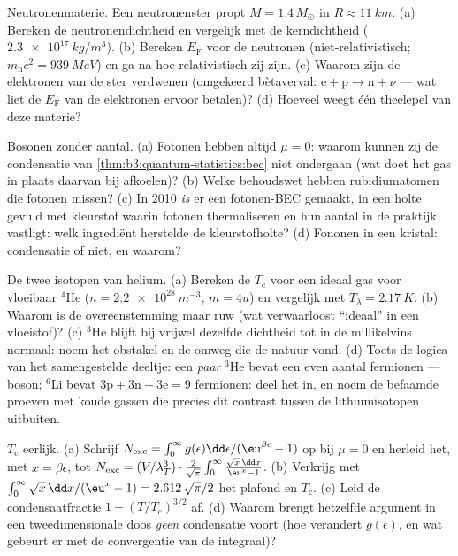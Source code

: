 \begin{exercise}[$\star\star$]\label{exo:b3:quantum-statistics:7}
Neutronenmaterie. Een neutronenster propt $M = 1.4\,M_\odot$ in $R
\approx \qty{11}{km}$. (a) Bereken de neutronendichtheid en vergelijk met de
kerndichtheid ($\qty{2.3e17}{kg/m^3}$). (b) Bereken $E_{\text{F}}$ voor de
neutronen (niet-relativistisch; $m_{\text{n}}c^2
= \qty{939}{MeV}$) en ga
na hoe relativistisch zij zijn. (c) Waarom zijn de elektronen van de ster
verdwenen (omgekeerd bètaverval: $\text{e} + \text{p} \to \text{n} + \nu$
--- wat liet de $E_{\text{F}}$ van de elektronen ervoor betalen)? (d)
Hoeveel weegt één theelepel van deze materie?
\end{exercise}

\begin{exercise}[$\star\star$]\label{exo:b3:quantum-statistics:8}
Bosonen zonder aantal. (a) Fotonen hebben altijd $\mu = 0$: waarom kunnen
zij de condensatie van \cref{thm:b3:quantum-statistics:bec} niet ondergaan
(wat doet het gas in plaats daarvan bij afkoelen)? (b) Welke behoudswet
hebben rubidiumatomen die fotonen missen? (c) In 2010 \emph{is} er een
fotonen-BEC gemaakt, in een holte gevuld met kleurstof waarin fotonen
thermaliseren en hun aantal in de praktijk vastligt: welk ingrediënt
herstelde de kleurstofholte? (d) Fononen in een kristal: condensatie of
niet, en waarom?
\end{exercise}

\begin{exercise}[$\star\star$]\label{exo:b3:quantum-statistics:9}
De twee isotopen van helium. (a) Bereken de $T_{\text{c}}$ voor een ideaal
gas voor vloeibaar $^4$He ($n = \qty{2.2e28}{m^{-3}}$, $m = 4u$) en
vergelijk met $T_\lambda = \qty{2.17}{K}$. (b) Waarom is de
overeenstemming maar ruw (wat verwaarloost ``ideaal'' in een vloeistof)?
(c) $^3$He blijft bij vrijwel dezelfde dichtheid tot in de millikelvins
normaal: noem het obstakel en de omweg die de natuur vond. (d) Toets de
logica van het samengestelde deeltje: een \emph{paar} $^3$He bevat een
even aantal fermionen --- boson; $^6$Li bevat $3\text{p} + 3\text{n}
+ 3\text{e} = 9$ fermionen: deel het in, en noem de befaamde proeven met
koude gassen die precies dit contrast tussen de lithiumisotopen uitbuiten.
\end{exercise}

\begin{exercise}[$\star\star\star$]\label{exo:b3:quantum-statistics:10}
$T_{\text{c}}$ eerlijk. (a) Schrijf $N_{\text{exc}} = \int_0^\infty
g(\epsilon)\dd\epsilon/(\eu^{\beta\epsilon} - 1)$ op bij $\mu = 0$ en
herleid het, met $x = \beta\epsilon$, tot $N_{\text{exc}} =
(V/\lambda_T^3)\cdot\frac{2}{\sqrt\pi}\int_0^\infty\frac{\sqrt
x\,\dd x}{\eu^x - 1}$. (b) Verkrijg met $\int_0^\infty\sqrt x\,\dd x/(
\eu^x - 1) = 2.612\,\sqrt\pi/2$ het plafond en $T_{\text{c}}$. (c) Leid de
condensaatfractie $1 -
(T/T_{\text{c}})^{3/2}$ af. (d) Waarom brengt
hetzelfde argument in een tweedimensionale doos \emph{geen} condensatie
voort (hoe verandert $g(
\epsilon)$, en wat gebeurt er met de convergentie
van de integraal)?
\end{exercise}

